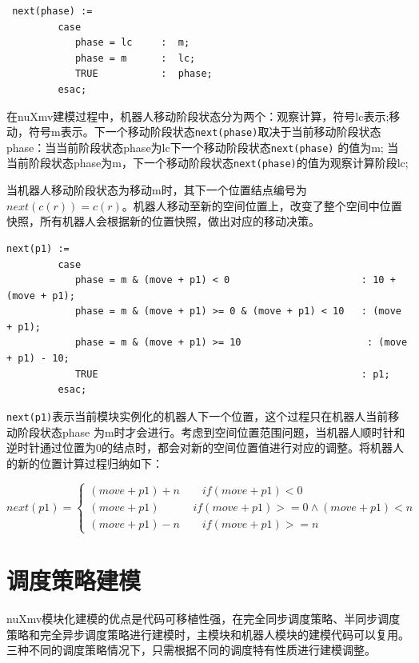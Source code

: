 \begin{lstlisting}
 next(phase) :=
         case
            phase = lc     :  m;
            phase = m      :  lc;
            TRUE           :  phase;
         esac;
\end{lstlisting}

在nuXmv建模过程中，机器人移动阶段状态分为两个：观察计算，符号lc表示;移动，符号m表示。下一个移动阶段状态\verb|next(phase)|取决于当前移动阶段状态phase：当当前阶段状态phase为lc下一个移动阶段状态\verb|next(phase)| 的值为m; 当当前阶段状态phase为m，下一个移动阶段状态\verb|next(phase)|的值为观察计算阶段lc;

当机器人移动阶段状态为移动m时，其下一个位置结点编号为$next\left(c\left(r\right)\right)=c\left(r\right)$。机器人移动至新的空间位置上，改变了整个空间中位置快照，所有机器人会根据新的位置快照，做出对应的移动决策。

\begin{lstlisting}
next(p1) :=
         case
            phase = m & (move + p1) < 0                       : 10 + (move + p1);
            phase = m & (move + p1) >= 0 & (move + p1) < 10   : (move + p1);
            phase = m & (move + p1) >= 10                      : (move + p1) - 10;
            TRUE                                              : p1;
         esac;
\end{lstlisting}

\verb|next(p1)|表示当前模块实例化的机器人下一个位置，这个过程只在机器人当前移动阶段状态phase 为m时才会进行。考虑到空间位置范围问题，当机器人顺时针和逆时针通过位置为0的结点时，都会对新的空间位置值进行对应的调整。将机器人的新的位置计算过程归纳如下：

$$ next\left(p1\right) = \left\{
\begin{array}{lcl}
\left(move + p1\right) + n \quad \quad  if \left(move + p1\right) < 0  \\
\left(move + p1\right)     \quad \quad \quad  if \left(move + p1\right) >= 0 \land \left(move + p1\right) < n \\
\left(move + p1\right) - n \quad \quad  if \left(move + p1\right) >= n
\end{array}
\right. $$



\section{调度策略建模}
nuXmv模块化建模的优点是代码可移植性强，在完全同步调度策略、半同步调度策略和完全异步调度策略进行建模时，主模块和机器人模块的建模代码可以复用。三种不同的调度策略情况下，只需根据不同的调度特有性质进行建模调整。

